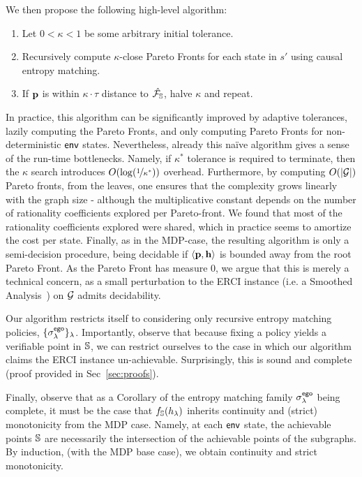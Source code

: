 \begin{mdframed}
  We then propose the following high-level algorithm:
\begin{enumerate}
\item Let $0 < \kappa < 1$ be some arbitrary initial tolerance.
\item Recursively compute $\kappa$-close Pareto Fronts for each state
in $s'$ using causal entropy matching.
\item If $\mathbf{p}$ is within $\kappa\cdot \tau$ distance to $\hat{\mathcal{F}_{\mathbb{S}}}$,
  halve $\kappa$ and repeat.
\end{enumerate}  
\end{mdframed}
In practice, this algorithm can be significantly improved by adaptive
tolerances, lazily computing the Pareto Fronts, and only computing
Pareto Fronts for non-deterministic $\mathsf{env}$ states. Nevertheless,
already this na\"ive algorithm gives a sense of the run-time
bottlenecks. Namely, if $\kappa^*$ tolerance is required to terminate,
then the $\kappa$ search introduces $O(\log(\nicefrac{1}{\kappa^*}))$
overhead. Furthermore, by computing $O(|\mathcal{G}|)$ Pareto fronts, from the
leaves, one ensures that the complexity grows linearly with the graph
size - although the multiplicative constant depends on the number of
rationality coefficients explored per Pareto-front. We found that most
of the rationality coefficients explored were shared, which in
practice seems to amortize the cost per state. Finally, as in the
MDP-case, the resulting algorithm is only a semi-decision procedure,
being decidable if $\langle \mathbf{p}, \mathbf{h} \rangle$ is
bounded away from the root Pareto Front. As the Pareto Front has
measure 0, we argue that this is merely a technical concern, as a
small perturbation to the ERCI instance (i.e. a Smoothed
Analysis~\cite{SmoothedAnalysis}) on $\mathcal{G}$ admits decidability.

Our algorithm restricts itself to considering only recursive entropy
matching policies, $\{\sigma^{\mathsf{ego}}_\lambda\}_\lambda$.
Importantly,
observe that because fixing a policy yields a verifiable point in
$\mathbb{S}$, we can restrict ourselves to the case in which our
algorithm claims the ERCI instance un-achievable. Surprisingly,
this is sound and complete (proof provided in Sec~\ref{sec:proofs}).

Finally, observe that as a Corollary of the entropy matching family
$\sigma^{\mathsf{ego}}_\lambda$ being complete, it must be the case that
$f_\mathbb{S}(h_\lambda)$ inherits continuity and (strict) monotonicity
from the MDP case. Namely, at each $\mathsf{env}$ state, the achievable
points $\mathbb{S}$ are necessarily the intersection of the achievable
points of the subgraphs. By induction, (with the MDP base case), we
obtain continuity and strict monotonicity.


